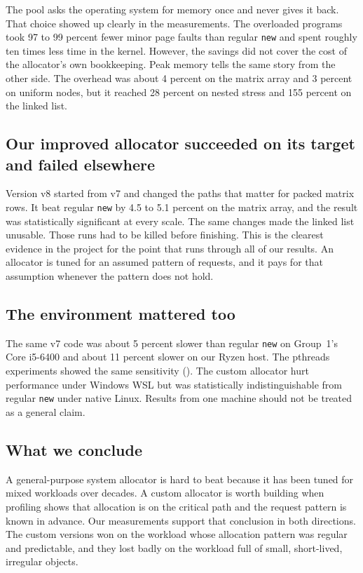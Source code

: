The pool asks the operating system for memory once and never gives it back.
That choice showed up clearly in the measurements.
The overloaded programs took 97 to 99 percent fewer minor page faults than
regular \texttt{new} and spent roughly ten times less time in the kernel.
However, the savings did not cover the cost of the allocator's own
bookkeeping.
Peak memory tells the same story from the other side.
The overhead was about 4 percent on the matrix array and 3 percent on uniform
nodes, but it reached 28 percent on nested stress and 155 percent on the
linked list.

\subsection{Our improved allocator succeeded on its target and failed
elsewhere}

Version v8 started from v7 and changed the paths that matter for packed matrix
rows.
It beat regular \texttt{new} by 4.5 to 5.1 percent on the matrix array, and the
result was statistically significant at every scale.
The same changes made the linked list unusable.
Those runs had to be killed before finishing.
This is the clearest evidence in the project for the point that runs through
all of our results.
An allocator is tuned for an assumed pattern of requests, and it pays for that
assumption whenever the pattern does not hold.

\subsection{The environment mattered too}

The same v7 code was about 5 percent slower than regular \texttt{new} on
Group~1's Core i5-6400 and about 11 percent slower on our Ryzen host.
The pthreads experiments showed the same sensitivity
().
The custom allocator hurt performance under Windows WSL but was statistically
indistinguishable from regular \texttt{new} under native Linux.
Results from one machine should not be treated as a general claim.

\subsection{What we conclude}

A general-purpose system allocator is hard to beat because it has been tuned
for mixed workloads over decades.
A custom allocator is worth building when profiling shows that allocation is on
the critical path and the request pattern is known in advance.
Our measurements support that conclusion in both directions.
The custom versions won on the workload whose allocation pattern was regular
and predictable, and they lost badly on the workload full of small,
short-lived, irregular objects.
